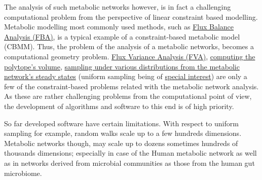 \documentclass[a4paper, 12pt]{article}
\begin{document}
The analysis of such metabolic networks however, is in fact a challenging computational problem from the perspective of linear constraint based modelling. Metabolic modelling most commonly used methods, such as \textcolor{blue}{\href{https://www.nature.com/articles/nbt.1614}{Flux Balance Analysis (FBA)}}, is a typical example of a constraint-based metabolic model (CBMM). Thus, the problem of the analysis of a metabolic networks, becomes a computational geometry problem. \textcolor{blue}{\href{https://www.nature.com/articles/s41540-019-0109-0}{Flux Variance Analysis (FVA)}}, \textcolor{blue}{\href{https://dl.acm.org/doi/fullHtml/10.1145/3194656}{computing the polytope's volume}}, 
\textcolor{blue}{\href{https://journals.plos.org/plosone/article?id=10.1371/journal.pone.0235393}{sampling under various distributions from the metabolic network's steady states}} (uniform sampling being of \textcolor{blue}{\href{https://academic.oup.com/bioinformatics/article/33/11/1741/2964731}{special interest}}) are only a few of the constraint-based problems related with the metabolic network analysis. As these are rather challenging problems from the computational point of view, the development of algorithms and software to this end is of high priority.

So far developed software have certain limitations. With respect to uniform sampling for example, random walks scale up to a few hundreds dimensions.  Metabolic networks though, may scale up to dozens sometimes hundreds of thousands dimensions; especially in case of the Human metabolic network as well as in networks derived from microbial communities as those from the human gut microbiome.


\end{document}
